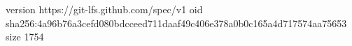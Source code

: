 version https://git-lfs.github.com/spec/v1
oid sha256:4a96b76a3cefd080bdcceed711daaf49c406e378a0b0c165a4d717574aa75653
size 1754
